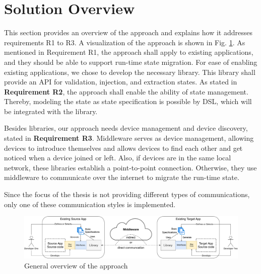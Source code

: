 \section{Solution Overview}
This section provides an overview of the approach and explains how it addresses requirements R1 to R3.
A visualization of the approach is shown in Fig. \ref{fig:solution-overview}. As mentioned in Requirement R1, the approach shall apply to existing applications, and they should be able to support run-time state migration. For ease of enabling existing applications, we chose to develop the necessary library. This library shall provide an API for validation, injection, and extraction states. As stated in \textbf{Requirement R2}, the approach shall enable the ability of state management. Thereby, modeling the state as state specification is possible by DSL, which will be integrated with the library.

Besides libraries, our approach needs device management and device discovery, stated in \textbf{Requirement R3}. Middleware serves as device management, allowing devices to introduce themselves and allows devices to find each other and get noticed when a device joined or left. Also, if devices are in the same local network, these libraries establish a point-to-point connection. Otherwise, they use middleware to communicate over the internet to migrate the run-time state.

Since the focus of the thesis is not providing different types of communications, only one of these communication styles is implemented.

\FloatBarrier
\begin{figure}[!b]
    \includegraphics[width=\linewidth]{../figures/solution-overview}
    \centering
    \caption{General overview of the approach}
    \label{fig:solution-overview}
\end{figure}
\FloatBarrier